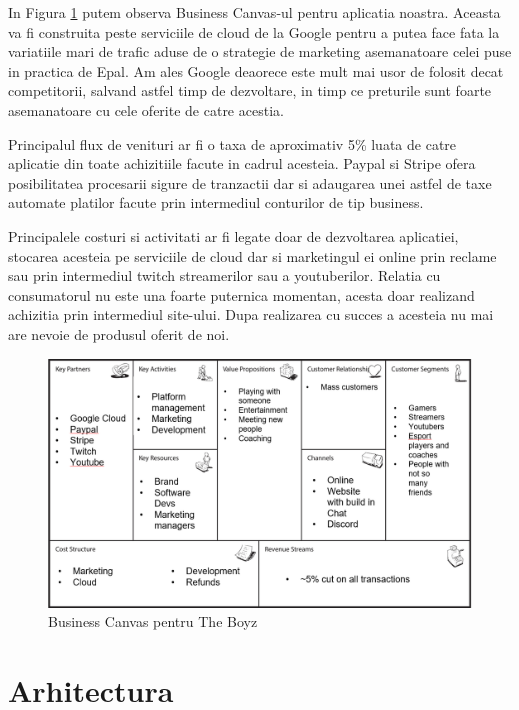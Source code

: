 \documentclass{article}
\begin{document}
In Figura \ref{fig:canvas} putem observa Business Canvas-ul pentru aplicatia noastra. Aceasta va fi construita peste serviciile de cloud de la Google pentru a putea face fata la variatiile mari de trafic aduse de o strategie de marketing asemanatoare celei puse in practica de Epal. Am ales Google deaorece este mult mai usor de folosit decat competitorii, salvand astfel timp de dezvoltare, in timp ce preturile sunt foarte asemanatoare cu cele oferite de catre acestia.

Principalul flux de venituri ar fi o taxa de aproximativ 5\% luata de catre aplicatie din toate achizitiile facute in cadrul acesteia. Paypal si Stripe ofera posibilitatea procesarii sigure de tranzactii dar si adaugarea unei astfel de taxe automate platilor facute prin intermediul conturilor de tip business. 

Principalele costuri si activitati ar fi legate doar de dezvoltarea aplicatiei, stocarea acesteia pe serviciile de cloud dar si marketingul ei online prin reclame sau prin intermediul twitch streamerilor sau a youtuberilor. Relatia cu consumatorul nu este una foarte puternica momentan, acesta doar realizand achizitia prin intermediul site-ului. Dupa realizarea cu succes a acesteia nu mai are nevoie de produsul oferit de noi.

\begin{figure}[ht]
\centering
\includegraphics[width=1\textwidth]{img/canvas.png}
\caption{Business Canvas pentru The Boyz} 
\label{fig:canvas}
\end{figure}

\section{Arhitectura}
\end{document}
